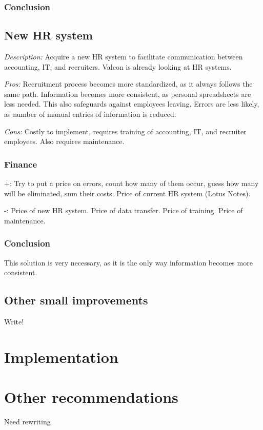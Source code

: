 \subsubsection{Conclusion}

\subsection{New HR system}
\emph{Description:} Acquire a new HR system to facilitate communication between accounting, IT, and recruiters.
Valcon is already looking at HR systems.

\emph{Pros:} Recruitment process becomes more standardized, as it always follows the same path.
Information becomes more consistent, as personal spreadsheets are less needed. 
This also safeguards against employees leaving.
Errors are less likely, as number of manual entries of information is reduced.

\emph{Cons:} Costly to implement, requires training of accounting, IT, and recruiter employees.
Also requires maintenance.

\subsubsection{Finance} +: Try to put a price on errors, count how many of them occur, guess how many will be eliminated, sum their costs.
Price of current HR system (Lotus Notes).

-: Price of new HR system.
Price of data transfer.
Price of training.
Price of maintenance.

\subsubsection{Conclusion} This solution is very necessary, as it is the only way information becomes more consistent.

\subsection{Other small improvements}

Write! 


\section{Implementation}

\section{Other recommendations}
Need rewriting 

